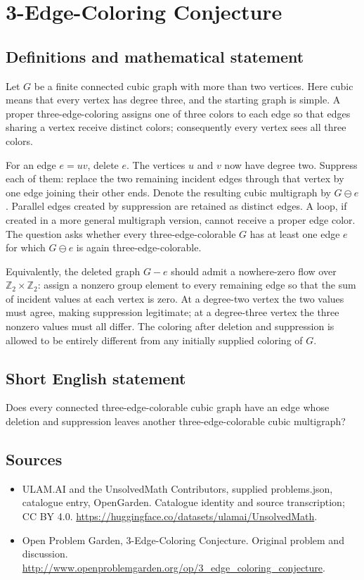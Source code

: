 \documentclass[11pt,a4paper]{article}
\begin{document}
\section*{3-Edge-Coloring Conjecture}\label{statement}

\subsection{Definitions and mathematical statement}
Let $G$ be a finite connected cubic graph with more than two vertices. Here cubic means that every vertex has degree three, and the starting graph is simple. A proper three-edge-coloring assigns one of three colors to each edge so that edges sharing a vertex receive distinct colors; consequently every vertex sees all three colors.

For an edge $e=uv$, delete $e$. The vertices $u$ and $v$ now have degree two. Suppress each of them: replace the two remaining incident edges through that vertex by one edge joining their other ends. Denote the resulting cubic multigraph by $G\mathbin{\ominus}e$. Parallel edges created by suppression are retained as distinct edges. A loop, if created in a more general multigraph version, cannot receive a proper edge color. The question asks whether every three-edge-colorable $G$ has at least one edge $e$ for which $G\mathbin{\ominus}e$ is again three-edge-colorable.

Equivalently, the deleted graph $G-e$ should admit a nowhere-zero flow over $\mathbb Z_2\times\mathbb Z_2$: assign a nonzero group element to every remaining edge so that the sum of incident values at each vertex is zero. At a degree-two vertex the two values must agree, making suppression legitimate; at a degree-three vertex the three nonzero values must all differ. The coloring after deletion and suppression is allowed to be entirely different from any initially supplied coloring of $G$.
\subsection{Short English statement}
Does every connected three-edge-colorable cubic graph have an edge whose deletion and suppression leaves another three-edge-colorable cubic multigraph?
\subsection{Sources}
\begin{itemize}
\item[S1] ULAM.AI and the UnsolvedMath Contributors, supplied problems.json, catalogue entry, OpenGarden. Catalogue identity and source transcription; CC BY 4.0.
\url{https://huggingface.co/datasets/ulamai/UnsolvedMath}.
\item[S2] Open Problem Garden, 3-Edge-Coloring Conjecture. Original problem and discussion.
\url{http://www.openproblemgarden.org/op/3_edge_coloring_conjecture}.
\end{itemize}
\end{document}
